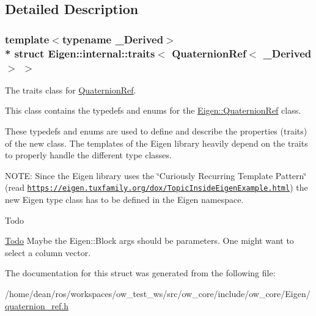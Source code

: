 \subsection{Detailed Description}
\subsubsection*{template$<$typename \+\_\+\+Derived$>$\\*
struct Eigen\+::internal\+::traits$<$ Quaternion\+Ref$<$ \+\_\+\+Derived $>$ $>$}

The traits class for \hyperlink{classEigen_1_1QuaternionRef}{Quaternion\+Ref}. 

This class contains the typedefs and enums for the \hyperlink{classEigen_1_1QuaternionRef}{Eigen\+::\+Quaternion\+Ref} class.

These typedefs and enums are used to define and describe the properties (traits) of the new class. The templates of the Eigen library heavily depend on the traits to properly handle the different type classes.

N\+O\+TE\+: Since the Eigen library uses the \char`\"{}\+Curiously Recurring Template Pattern\char`\"{} (read \href{https://eigen.tuxfamily.org/dox/TopicInsideEigenExample.html}{\tt https\+://eigen.\+tuxfamily.\+org/dox/\+Topic\+Inside\+Eigen\+Example.\+html}) the new Eigen type class has to be defined in the Eigen namespace.

\begin{DoxyRefDesc}{Todo}
\item[\hyperlink{todo__todo000005}{Todo}]Maybe the Eigen\+::\+Block args should be parameters. One might want to select a column vector. \end{DoxyRefDesc}


The documentation for this struct was generated from the following file\+:\begin{DoxyCompactItemize}
\item 
/home/dean/ros/workspaces/ow\+\_\+test\+\_\+ws/src/ow\+\_\+core/include/ow\+\_\+core/\+Eigen/\hyperlink{Eigen_2quaternion__ref_8h}{quaternion\+\_\+ref.\+h}\end{DoxyCompactItemize}
